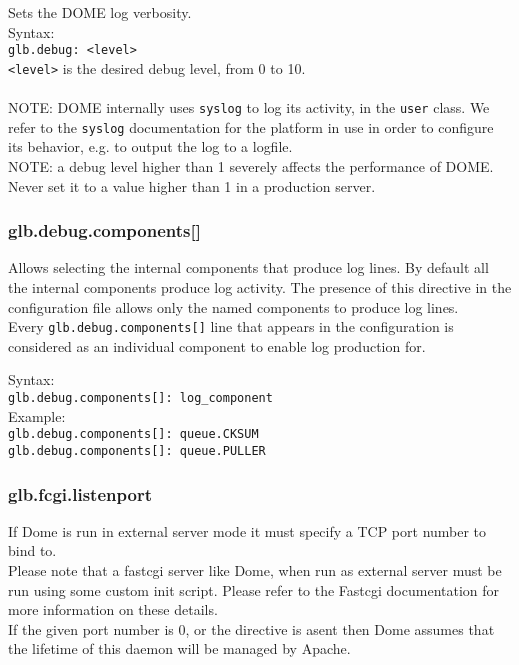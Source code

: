 \documentclass[a4paper,10pt]{scrreprt}
\begin{document}
 Sets the DOME log verbosity.\\
 
 Syntax:\\

\lstinline"glb.debug: <level>"\\

\lstinline"<level>" is the desired debug level, from 0 to 10.\\ \\
 NOTE: DOME internally uses \lstinline"syslog" to log its activity, in the \lstinline"user" class. We refer to the \lstinline"syslog" documentation for the platform in use in order to configure its behavior, e.g. to output the log to a logfile.\\
 
 NOTE: a debug level higher than 1 severely affects the performance of DOME. Never set it to a value higher than 1 in a production server.\\

\subsubsection{glb.debug.components[]}

 Allows selecting the internal components that produce log lines. By default all the internal components produce log activity. The presence of this directive in the configuration file allows only the named components to produce log lines.\\

 Every \lstinline"glb.debug.components[]" line that appears in the configuration is considered as an individual component to enable log production for.

 Syntax:\\

\lstinline"glb.debug.components[]: log_component"\\

 Example:\\
\lstinline"glb.debug.components[]: queue.CKSUM"\\
\lstinline"glb.debug.components[]: queue.PULLER"\\


\subsubsection{glb.fcgi.listenport}
If Dome is run in external server mode it must specify a TCP port number to bind to.\\
Please note that a fastcgi server like Dome, when run as external server must be run using some custom init script. Please refer to the Fastcgi documentation for more information on these details.\\
If the given port number is 0, or the directive is asent then Dome assumes that the lifetime of this daemon will be managed by Apache.\\
\end{document}

